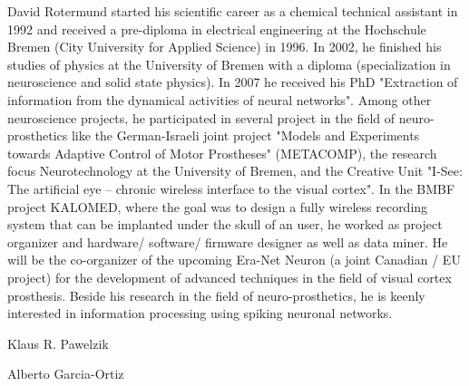 \begin{IEEEbiography}{David Rotermund} started his scientific career as a chemical technical assistant in 1992 and received a pre-diploma in electrical engineering at the Hochschule Bremen (City University for Applied Science) in 1996. In 2002, he finished his studies of physics at the University of Bremen with a diploma (specialization in neuroscience and solid state physics). In 2007 he received his PhD "Extraction of information from the dynamical activities of neural networks". Among other neuroscience projects, he participated in several project in the field of neuro-prosthetics like the German-Israeli joint project "Models and Experiments towards Adaptive Control of Motor Prostheses" (METACOMP), the research focus Neurotechnology at the University of Bremen, and the Creative Unit "I-See: The artificial eye -- chronic wireless interface to the visual cortex". In the BMBF project KALOMED, where the goal was to design a fully wireless recording system that can be implanted under the skull of an user, he worked as project organizer and hardware/ software/ firmware designer as well as data miner. He will be the co-organizer of the upcoming Era-Net Neuron (a joint Canadian / EU project) for the development of advanced techniques in the field of visual cortex prosthesis. Beside his research in the field of neuro-prosthetics, he is keenly interested in information processing using spiking neuronal networks.
\end{IEEEbiography}

\begin{IEEEbiography}{Klaus R. Pawelzik}
\end{IEEEbiography}

\begin{IEEEbiography}{Alberto Garcia-Ortiz}
\end{IEEEbiography}
